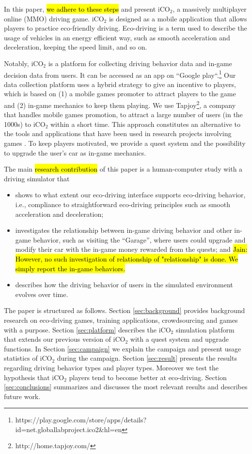 \documentclass[preprint,authoryear,12pt]{elsarticle}
\newcommand{\hlc}[2][yellow]{ {\sethlcolor{#1} \hl{#2}} }
\begin{document}
In this paper, \hl{we adhere to these steps} and present iCO$_2$, a massively multiplayer online (MMO) driving game. iCO$_2$ is designed as a mobile application that allows players to practice eco-friendly driving. Eco-driving is a term used to describe the usage of vehicles in an energy efficient way, such as smooth acceleration and deceleration, keeping the speed limit, and so on.

Notably, iCO$_2$ is a platform for collecting driving behavior data and in-game decision data from users. It can be accessed as an app on ``Google play``.\footnote{https://play.google.com/store/apps/details?id=net.globallabproject.ico2\&hl=en}
Our data collection platform uses a hybrid strategy to give an incentive to players, which is based on (1) a mobile games promoter to attract players to the game and (2) in-game mechanics to keep them playing. We use Tapjoy\footnote{http://home.tapjoy.com/}, %
a company that handles mobile games promotion, to attract a large number of users (in the 1000s) to iCO$_2$ within a short time. This approach constitutes an alternative to the tools and applications that have been used in research projects involving games \citep{kittur2008crowdsourcing,Biewald:2012,ChanH12}.
To keep players motivated, we provide a quest system and the possibility to upgrade the user's car as in-game mechanics.

The main \hl{research contribution} of this paper is a human-computer study with a driving simulator that
\begin{itemize}
\item shows to what extent our eco-driving interface supports eco-driving behavior, i.e., compliance to straightforward eco-driving principles such as smooth acceleration and deceleration;
\item investigates the relationship between in-game driving behavior and other in-game behavior, such as visiting the ``Garage'', where users could upgrade and modify their car with the in-game money rewarded from the quests; and
\hlc{Jain: However, no such investigation of relationship of "relationship" is done. We simply report the in-game behaviors. }
\item describes how the driving behavior of users in the simulated environment evolves over time.
\end{itemize}


The paper is structured as follows.
Section \ref{sec:background} provides background research on eco-driving games, training applications, crowdsourcing and games with a purpose.
Section \ref{sec:platform} describes the iCO$_2$ simulation platform that extends our previous version of iCO$_2$
\citep{prendingeroliveira2014} with a quest system and upgrade functions.
In Section \ref{sec:campaign} we explain the campaign and present usage statistics of iCO$_2$ during the campaign.
Section \ref{sec:result} presents the results regarding driving behavior types and player types.  Moreover we test the hypothesis that iCO$_2$ players tend to become better at eco-driving.
Section \ref{sec:conclusions} summarizes and discusses the most relevant results and describes future work.
\end{document}
